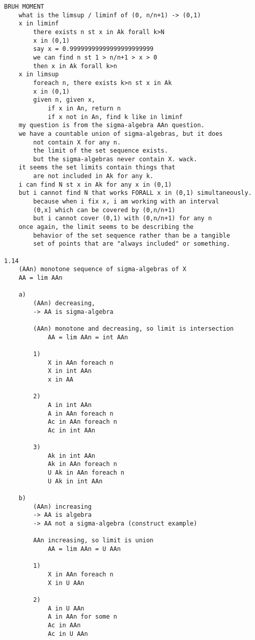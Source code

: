 \documentclass{article}
\begin{document}
\begin{flushleft}
\begin{verbatim}
BRUH MOMENT 
    what is the limsup / liminf of (0, n/n+1) -> (0,1)
    x in liminf 
        there exists n st x in Ak forall k>N
        x in (0,1)
        say x = 0.99999999999999999999999
        we can find n st 1 > n/n+1 > x > 0 
        then x in Ak forall k>n 
    x in limsup 
        foreach n, there exists k>n st x in Ak 
        x in (0,1)
        given n, given x, 
            if x in An, return n 
            if x not in An, find k like in liminf 
    my question is from the sigma-algebra AAn question. 
    we have a countable union of sigma-algebras, but it does 
        not contain X for any n. 
        the limit of the set sequence exists. 
        but the sigma-algebras never contain X. wack.
    it seems the set limits contain things that 
        are not included in Ak for any k.
    i can find N st x in Ak for any x in (0,1)
    but i cannot find N that works FORALL x in (0,1) simultaneously.
        because when i fix x, i am working with an interval 
        (0,x] which can be covered by (0,n/n+1) 
        but i cannot cover (0,1) with (0,n/n+1) for any n 
    once again, the limit seems to be describing the 
        behavior of the set sequence rather than be a tangible 
        set of points that are "always included" or something. 

1.14
    (AAn) monotone sequence of sigma-algebras of X 
    AA = lim AAn 
    
    a)
        (AAn) decreasing, 
        -> AA is sigma-algebra 

        (AAn) monotone and decreasing, so limit is intersection 
            AA = lim AAn = int AAn 

        1)
            X in AAn foreach n 
            X in int AAn 
            x in AA 
        
        2)
            A in int AAn 
            A in AAn foreach n 
            Ac in AAn foreach n 
            Ac in int AAn 

        3)
            Ak in int AAn 
            Ak in AAn foreach n 
            U Ak in AAn foreach n 
            U Ak in int AAn 

    b)
        (AAn) increasing 
        -> AA is algebra
        -> AA not a sigma-algebra (construct example)

        AAn increasing, so limit is union 
            AA = lim AAn = U AAn 

        1)
            X in AAn foreach n  
            X in U AAn 

        2)
            A in U AAn 
            A in AAn for some n 
            Ac in AAn 
            Ac in U AAn 


\end{verbatim}
\end{flushleft}
\end{document}
